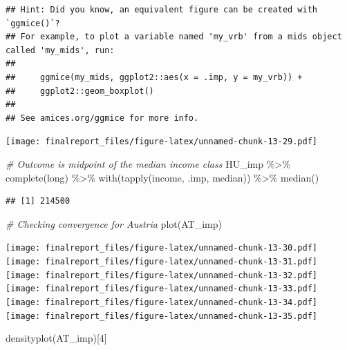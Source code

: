 \documentclass[
]{article}
\newenvironment{Shaded}{\begin{snugshade}}{\end{snugshade}}
\newcommand{\CommentTok}[1]{\textcolor[rgb]{0.56,0.35,0.01}{\textit{#1}}}
\newcommand{\DecValTok}[1]{\textcolor[rgb]{0.00,0.00,0.81}{#1}}
\newcommand{\FunctionTok}[1]{\textcolor[rgb]{0.00,0.00,0.00}{#1}}
\newcommand{\NormalTok}[1]{#1}
\newcommand{\SpecialCharTok}[1]{\textcolor[rgb]{0.00,0.00,0.00}{#1}}
\newcommand{\StringTok}[1]{\textcolor[rgb]{0.31,0.60,0.02}{#1}}
\begin{document}
\begin{verbatim}
## Hint: Did you know, an equivalent figure can be created with `ggmice()`?
## For example, to plot a variable named 'my_vrb' from a mids object called 'my_mids', run: 
## 
##     ggmice(my_mids, ggplot2::aes(x = .imp, y = my_vrb)) +
##     ggplot2::geom_boxplot() 
## 
## See amices.org/ggmice for more info.
\end{verbatim}

\texttt{[image: finalreport\_files/figure-latex/unnamed-chunk-13-29.pdf]}

\begin{Shaded}
\begin{Highlighting}[]
\CommentTok{\# Outcome is midpoint of the median income class}
\NormalTok{HU\_imp }\SpecialCharTok{\%\textgreater{}\%} 
  \FunctionTok{complete}\NormalTok{(}\StringTok{\textquotesingle{}long\textquotesingle{}}\NormalTok{) }\SpecialCharTok{\%\textgreater{}\%} 
  \FunctionTok{with}\NormalTok{(}\FunctionTok{tapply}\NormalTok{(income, .imp, median)) }\SpecialCharTok{\%\textgreater{}\%} 
  \FunctionTok{median}\NormalTok{()}
\end{Highlighting}
\end{Shaded}

\begin{verbatim}
## [1] 214500
\end{verbatim}

\begin{Shaded}
\begin{Highlighting}[]
\CommentTok{\# Checking convergence for Austria}
\FunctionTok{plot}\NormalTok{(AT\_imp)}
\end{Highlighting}
\end{Shaded}

\texttt{[image: finalreport\_files/figure-latex/unnamed-chunk-13-30.pdf]}
\texttt{[image: finalreport\_files/figure-latex/unnamed-chunk-13-31.pdf]}
\texttt{[image: finalreport\_files/figure-latex/unnamed-chunk-13-32.pdf]}
\texttt{[image: finalreport\_files/figure-latex/unnamed-chunk-13-33.pdf]}
\texttt{[image: finalreport\_files/figure-latex/unnamed-chunk-13-34.pdf]}
\texttt{[image: finalreport\_files/figure-latex/unnamed-chunk-13-35.pdf]}

\begin{Shaded}
\begin{Highlighting}[]
\FunctionTok{densityplot}\NormalTok{(AT\_imp)[}\DecValTok{4}\NormalTok{]}
\end{Highlighting}
\end{Shaded}
\end{document}
